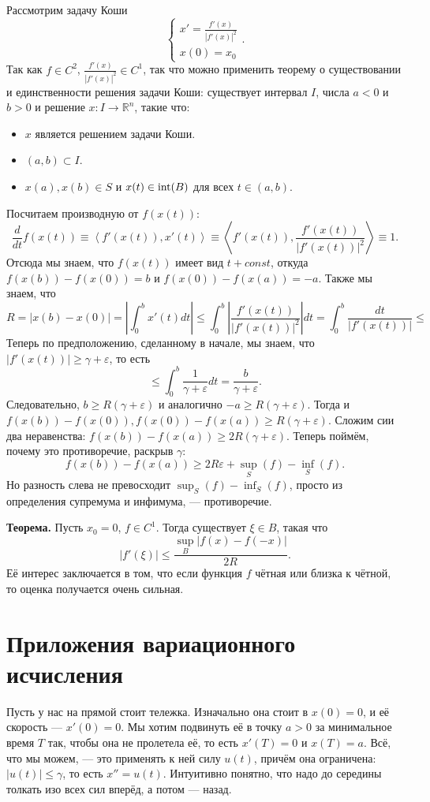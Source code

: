 Рассмотрим задачу Коши
\[
    \begin{cases}
        x' = \frac{f'(x)}{|f'(x)|^2} \\
        x(0) = x_0
    \end{cases}
    .
\]
Так как $f \in C^2$, $\frac{f'(x)}{|f'(x)|^2} \in C^1$, так что можно применить теорему о существовании и единственности решения задачи Коши: существует интервал $I$, числа $a < 0$ и $b > 0$ и решение $x: I \to \mathbb R^n$, такие что:
\begin{itemize}
    \item $x$ является решением задачи Коши.
    \item $(a, b) \subset I$.
    \item $x(a), x(b) \in S$ и $x(t) \in \operatorname{int}(B)$ для всех $t \in (a, b)$.
\end{itemize}

Посчитаем производную от $f(x(t))$:
\[
    \frac{d}{dt} f(x(t)) \equiv \left<f'(x(t)), x'(t) \right> \equiv \left<f'(x(t)), \frac{f'(x(t))}{|f'(x(t))|^2} \right> \equiv 1.
\]
Отсюда мы знаем, что $f(x(t))$ имеет вид $t + const$, откуда $f(x(b)) - f(x(0)) = b$ и $f(x(0)) - f(x(a)) = -a$.
Также мы знаем, что 
\[
    R = |x(b) - x(0)| = \left| \int_0^b x'(t) dt \right| \le \int_0^b \left| \frac{f'(x(t))}{|f'(x(t))|^2} \right| dt = \int_0^b \frac{dt}{|f'(x(t))|} \le
\]
Теперь по предположению, сделанному в начале, мы знаем, что $|f'(x(t))| \ge \gamma + \varepsilon$, то есть
\[
    \le \int_0^b \frac{1}{\gamma + \varepsilon} dt = \frac{b}{\gamma + \varepsilon}.
\]
Следовательно, $b \ge R(\gamma + \varepsilon)$ и аналогично $-a \ge R(\gamma + \varepsilon)$.
Тогда и $f(x(b)) - f(x(0)), f(x(0)) - f(x(a)) \ge R(\gamma + \varepsilon)$.
Сложим сии два неравенства: $f(x(b)) - f(x(a)) \ge 2R(\gamma + \varepsilon)$.
Теперь поймём, почему это противоречие, раскрыв $\gamma$:
\[
    f(x(b)) - f(x(a)) \ge 2R \varepsilon + \sup_S(f) - \inf_S(f).
\]
Но разность слева не превосходит $\sup_S(f) - \inf_S(f)$, просто из определения супремума и инфимума, --- противоречие.

\QED

\textbf{Теорема.} Пусть $x_0 = 0$, $f \in C^1$. Тогда существует $\xi \in B$, такая что
\[
    |f'(\xi)| \le \frac{\sup_B |f(x) - f(-x)|}{2R}.
\]
Её интерес заключается в том, что если функция $f$ чётная или близка к чётной, то оценка получается очень сильная.

\section{Приложения вариационного исчисления}
Пусть у нас на прямой стоит тележка. Изначально она стоит в $x(0) = 0$, и её скорость --- $x'(0) = 0$.
Мы хотим подвинуть её в точку $a > 0$ за минимальное время $T$ так, чтобы она не пролетела её, то есть $x'(T) = 0$ и $x(T) = a$.
Всё, что мы можем, --- это применять к ней силу $u(t)$, причём она ограничена: $|u(t)| \le \gamma$, то есть $x'' = u(t)$.
Интуитивно понятно, что надо до середины толкать изо всех сил вперёд, а потом --- назад.

